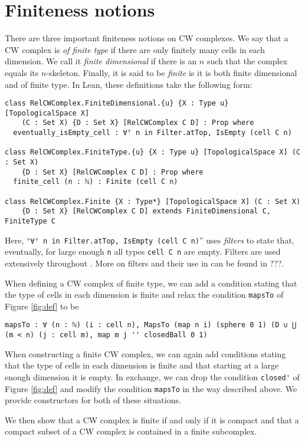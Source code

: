 \section{Finiteness notions}


There are three important finiteness notions on CW complexes. 
We say that a CW complex is \emph{of finite type} if there are only finitely many cells in each dimension. 
We call it \emph{finite dimensional} if there is an $n$ such that the complex equals its $n$-skeleton.
Finally, it is said to be \emph{finite} is it is both finite dimensional and of finite type. 
In Lean, these definitions take the following form: 

\begin{lstlisting}[frame=single]
class RelCWComplex.FiniteDimensional.{u} {X : Type u} [TopologicalSpace X] 
    (C : Set X) {D : Set X} [RelCWComplex C D] : Prop where
  eventually_isEmpty_cell : ∀ᶠ n in Filter.atTop, IsEmpty (cell C n)

class RelCWComplex.FiniteType.{u} {X : Type u} [TopologicalSpace X] (C : Set X) 
    {D : Set X} [RelCWComplex C D] : Prop where
  finite_cell (n : ℕ) : Finite (cell C n)

class RelCWComplex.Finite {X : Type*} [TopologicalSpace X] (C : Set X) 
    {D : Set X} [RelCWComplex C D] extends FiniteDimensional C, FiniteType C
\end{lstlisting}

Here, ``\lstinline|∀ᶠ n in Filter.atTop, IsEmpty (cell C n)|'' uses \emph{filters} to state that, eventually, for large enough \lstinline|n| all types \lstinline|cell C n| are empty. 
Filters are used extensively throughout \mathlib. 
More on filters and their use in \mathlib can be found in ???. 

When defining a CW complex of finite type, we can add a condition stating that the type of cells in each dimension is finite and relax the condition \lstinline|mapsTo| of Figure \ref{fig:def} to be

\begin{lstlisting}[frame=single]
mapsTo : ∀ (n : ℕ) (i : cell n), MapsTo (map n i) (sphere 0 1) (D ∪ ⋃ (m < n) (j : cell m), map m j '' closedBall 0 1)
\end{lstlisting}

When constructing a finite CW complex, we can again add conditions stating that the type of cells in each dimension is finite and that starting at a large enough dimension it is empty.
In exchange, we can drop the condition \lstinline|closed'| of Figure \ref{fig:def} and modify the condition \lstinline|mapsTo| in the way described above. 
We provide constructors for both of these situations.

We then show that a CW complex is finite if and only if it is compact and that a compact subset of a CW complex is contained in a finite subcomplex.